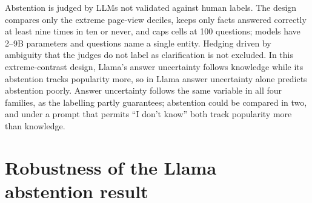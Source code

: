 \documentclass{article}
\newcommand{\idk}{``I don't know''}
\begin{document}
Abstention is judged by LLMs not validated against human labels. The design compares only the extreme page-view deciles, keeps only facts answered correctly at least nine times in ten or never, and caps cells at 100 questions; models have 2--9B parameters and questions name a single entity. Hedging driven by ambiguity that the judges do not label as clarification is not excluded. In this extreme-contrast design, Llama's answer uncertainty follows knowledge while its abstention tracks popularity more, so in Llama answer uncertainty alone predicts abstention poorly. Answer uncertainty follows the same variable in all four families, as the labelling partly guarantees; abstention could be compared in two, and under a prompt that permits \idk{} both track popularity more than knowledge.




\appendix

\section{Robustness of the Llama abstention result}
\label{app:robust}
\end{document}
